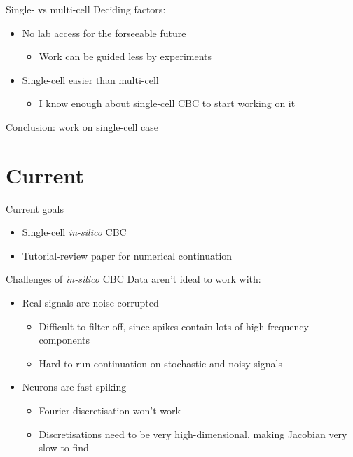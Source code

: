\documentclass[presentation]{beamer}
\begin{document}
\begin{frame}[label={sec:orgf004362}]{Single- vs multi-cell}
Deciding factors:

\vfill

\begin{itemize}
\item No lab access for the forseeable future
\begin{itemize}
\item Work can be guided less by experiments
\end{itemize}
\item Single-cell easier than multi-cell
\begin{itemize}
\item I know enough about single-cell CBC to start working on it
\end{itemize}
\end{itemize}

\vfill

Conclusion: work on single-cell case
\end{frame}


\section{Current}
\label{sec:org97e4509}
\begin{frame}[label={sec:orgcf579b1}]{Current goals}
\begin{itemize}
\item Single-cell \emph{in-silico} CBC
\item Tutorial-review paper for numerical continuation
\end{itemize}
\end{frame}

\begin{frame}[label={sec:orga80a685}]{Challenges of \emph{in-silico} CBC}
Data aren't ideal to work with:
\vfill
\begin{itemize}
\item Real signals are noise-corrupted
\begin{itemize}
\item Difficult to filter off, since spikes contain lots of high-frequency components
\item Hard to run continuation on stochastic and noisy signals
\end{itemize}
\end{itemize}
\vfill
\begin{itemize}
\item Neurons are fast-spiking
\begin{itemize}
\item Fourier discretisation won't work
\item Discretisations need to be very high-dimensional, making Jacobian very slow to find
\end{itemize}
\end{itemize}

\vfill
\end{frame}
\end{document}
